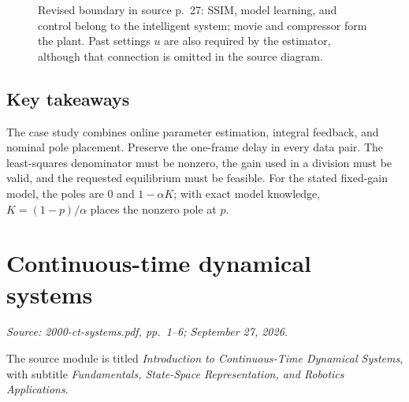 \documentclass[11pt,a4paper]{article}
\numberwithin{equation}{section}
\numberwithin{figure}{section}
\numberwithin{table}{section}
\newcommand{\source}[1]{\par{\small\color{muted}\textit{Source: #1.}}\par}
\newcommand{\module}[2]{\clearpage\section{#1}\source{#2}}
\begin{document}
\begin{figure}[htbp]\centering
{}
\caption{Revised boundary in source p.\ 27: SSIM, model learning, and control belong to the intelligent system; movie and compressor form the plant. Past settings $u$ are also required by the estimator, although that connection is omitted in the source diagram.}
\label{fig:adaptive}
\end{figure}\FloatBarrier
\subsection{Key takeaways}
The case study combines online parameter estimation, integral feedback, and nominal pole placement. Preserve the one-frame delay in every data pair. The least-squares denominator must be nonzero, the gain used in a division must be valid, and the requested equilibrium must be feasible. For the stated fixed-gain model, the poles are $0$ and $1-\alpha K$; with exact model knowledge, $K=(1-p)/\alpha$ places the nonzero pole at $p$.

\module{Continuous-time dynamical systems}{2000-ct-systems.pdf, pp.\ 1--6; September 27, 2026}
The source module is titled \emph{Introduction to Continuous-Time Dynamical Systems}, with subtitle \emph{Fundamentals, State-Space Representation, and Robotics Applications}.
\end{document}
